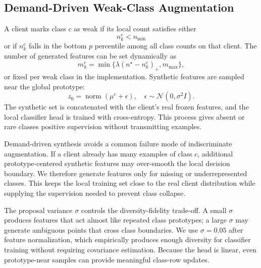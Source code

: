 ﻿\documentclass[runningheads]{llncs}
\begin{document}
\subsection{Demand-Driven Weak-Class Augmentation}
A client marks class $c$ as weak if its local count satisfies either
\begin{equation}
n_k^c < n_{\min}
\end{equation}
or if $n_k^c$ falls in the bottom $p$ percentile among all class counts on that client. The number of generated features can be set dynamically as
\begin{equation}
m_k^c = \min\{\lambda(n^\star-n_k^c)_+, m_{\max}\},
\end{equation}
or fixed per weak class in the implementation. Synthetic features are sampled near the global prototype:
\begin{equation}
z_0 = \operatorname{norm}(\mu^c + \epsilon), \quad \epsilon\sim\mathcal{N}(0,\sigma^2 I).
\end{equation}
The synthetic set is concatenated with the client's real frozen features, and the local classifier head is trained with cross-entropy. This process gives absent or rare classes positive supervision without transmitting examples.

Demand-driven synthesis avoids a common failure mode of indiscriminate augmentation. If a client already has many examples of class $c$, additional prototype-centered synthetic features may over-smooth the local decision boundary. We therefore generate features only for missing or underrepresented classes. This keeps the local training set close to the real client distribution while supplying the supervision needed to prevent class collapse.

The proposal variance $\sigma$ controls the diversity-fidelity trade-off. A small $\sigma$ produces features that act almost like repeated class prototypes; a large $\sigma$ may generate ambiguous points that cross class boundaries. We use $\sigma=0.05$ after feature normalization, which empirically produces enough diversity for classifier training without requiring covariance estimation. Because the head is linear, even prototype-near samples can provide meaningful class-row updates.
\end{document}
